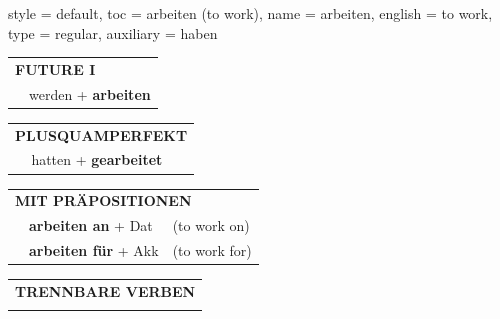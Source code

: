 \begin{verbentry}{
  style = {default},
  toc = {arbeiten (to work)},
  name = {arbeiten},
  english = {to work},
  type = {regular},
  auxiliary = {haben}
}
\begin{tabular}{rl}
    \multicolumn{2}{l}{\textbf{FUTURE I} }\\
   & werden + \textbf{arbeiten}\\
 
  \end{tabular}
\hfill
   \begin{tabular}{rl}
      \multicolumn{2}{l}{\textbf{PLUSQUAMPERFEKT}}\\
   & hatten + \textbf{gearbeitet}\\
  \end{tabular}
  

    \vspace{10pt}
    
   \begin{tabular}{lll}
      \multicolumn{3}{l}{\textbf{MIT PRÄPOSITIONEN}}\\
& \textbf{arbeiten an} + Dat & (to work on)\\
& \textbf{arbeiten für} + Akk & (to work for)\\
   \end{tabular}
  \hfill
   \begin{tabular}{lll}
      \multicolumn{3}{l}{\textbf{TRENNBARE VERBEN}}\\
\vspace{20pt}
  \end{tabular}


  \vspace{-5pt}
\end{verbentry}

